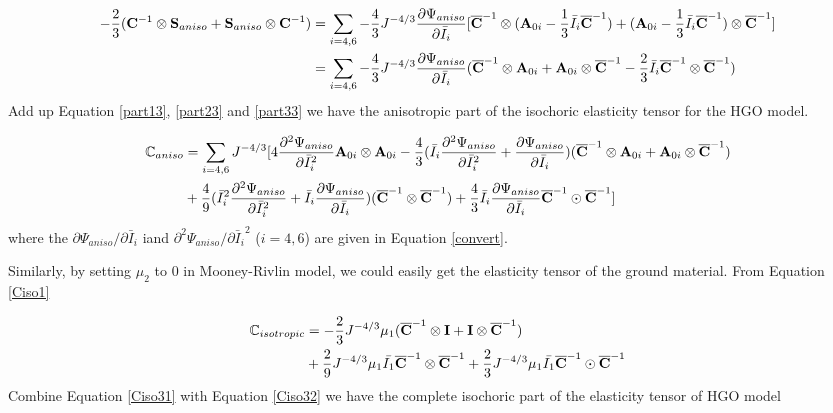 \begin{equation} \label{part33}
\begin{split}
-\frac{2}{3}(\bold{C}^{-1} \otimes \bold{S}_{aniso} + \bold{S}_{aniso} \otimes \bold{C}^{-1}) &=
\sum_{i = 4, 6} -\frac{4}{3}J^{-4/3}\frac{\partial\Psi_{aniso}}{\partial\bar{I}_i}
[\overline{\bold{C}}^{-1} \otimes (\bold{A}_{0i} - \frac{1}{3}\bar{I}_i \overline{\bold{C}}^{-1})
+ (\bold{A}_{0i} - \frac{1}{3}\bar{I}_i \overline{\bold{C}}^{-1}) \otimes \overline{\bold{C}}^{-1}] \\
&= \sum_{i = 4, 6} -\frac{4}{3}J^{-4/3}\frac{\partial\Psi_{aniso}}{\partial\bar{I}_i}
(\overline{\bold{C}}^{-1} \otimes \bold{A}_{0i} + \bold{A}_{0i} \otimes \overline{\bold{C}}^{-1} 
- \frac{2}{3} \bar{I}_i \overline{\bold{C}}^{-1} \otimes \overline{\bold{C}}^{-1}) \\
\end{split}
\end{equation}
Add up Equation \ref{part13}, \ref{part23} and \ref{part33} we have the anisotropic part of the isochoric elasticity tensor for the HGO model.

\begin{equation} \label{Ciso31}
\begin{split}
\mathbb{C}_{aniso} 
&= \sum_{i = 4, 6} J^{-4/3}[4\frac{\partial^2\Psi_{aniso}}{\partial{\bar{I}_i}^2} \bold{A}_{0i} \otimes \bold{A}_{0i} - \frac{4}{3}(\bar{I}_i\frac{\partial^2\Psi_{aniso}}{\partial{\bar{I}_i}^2} + \frac{\partial\Psi_{aniso}}{\partial{\bar{I}_i}})(\overline{\bold{C}}^{-1} \otimes \bold{A}_{0i} + \bold{A}_{0i} \otimes \overline{\bold{C}}^{-1}) \\
&+ \frac{4}{9}({\bar{I}_i}^2\frac{\partial^2\Psi_{aniso}}{\partial{\bar{I}_i}^2} + \bar{I}_i\frac{\partial\Psi_{aniso}}{\partial{\bar{I}_i}})(\overline{\bold{C}}^{-1} \otimes \overline{\bold{C}}^{-1}) 
+ \frac{4}{3}\bar{I}_i \frac{\partial\Psi_{aniso}}{\partial{\bar{I}_i}} \overline{\bold{C}}^{-1} \odot \overline{\bold{C}}^{-1}]
\end{split}
\end{equation}
where the $\partial\Psi_{aniso}/\partial{\bar{I}_i}$ iand $\partial^2\Psi_{aniso}/{\partial{\bar{I}_i}^2}$ ($i = 4, 6$) are given in Equation \ref{convert}.

Similarly, by setting $\mu_2$ to $0$ in Mooney-Rivlin model, we could easily get the elasticity tensor of the ground material. From Equation \ref{Ciso1}

\begin{equation} \label{Ciso32}
\begin{split}
\mathbb{C}_{isotropic} &=
- \frac{2}{3}J^{-4/3}\mu_1({\overline{\bold{C}}}^{-1} \otimes \bold{I} + \bold{I} \otimes {\overline{\bold{C}}}^{-1})  \\
&+
\frac{2}{9}J^{-4/3}\mu_1\bar{I_1}  {\overline{\bold{C}}}^{-1} \otimes {\overline{\bold{C}}}^{-1} + \frac{2}{3}J^{-4/3} \mu_1\bar{I_1} {\overline{\bold{C}}}^{-1} \odot {\overline{\bold{C}}}^{-1} 
\end{split}
\end{equation}
Combine Equation \ref{Ciso31} with Equation \ref{Ciso32} we have the complete isochoric part of the elasticity tensor of HGO model


